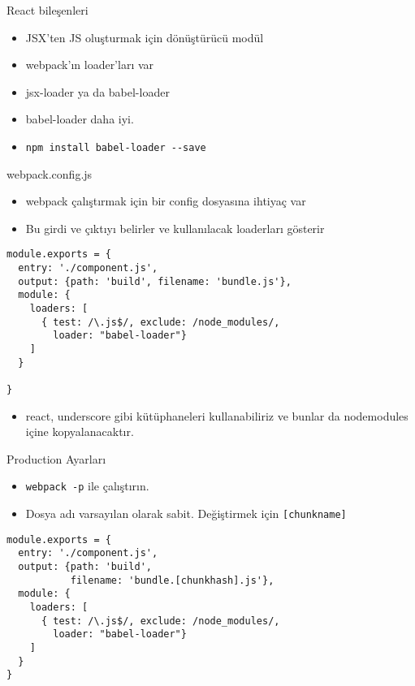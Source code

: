 \documentclass[presentation]{beamer}
\begin{document}
\begin{frame}[fragile,label=sec-6]{React bileşenleri}
 \begin{itemize}
\item JSX'ten JS oluşturmak için dönüştürücü modül
\item webpack'ın loader'ları var
\item jsx-loader ya da babel-loader
\item babel-loader daha iyi.
\item \texttt{npm install babel-loader -{}-save}
\end{itemize}
\end{frame}

\begin{frame}[fragile,label=sec-7]{webpack.config.js}
 \begin{itemize}
\item webpack çalıştırmak için bir config dosyasına ihtiyaç var
\item Bu girdi ve çıktıyı belirler ve kullanılacak loaderları gösterir
\end{itemize}

\begin{verbatim}
module.exports = {
  entry: './component.js',
  output: {path: 'build', filename: 'bundle.js'},
  module: {
    loaders: [
      { test: /\.js$/, exclude: /node_modules/,
        loader: "babel-loader"}
    ]
  }

}
\end{verbatim}

\begin{itemize}
\item react, underscore gibi kütüphaneleri kullanabiliriz ve bunlar da
nodemodules içine kopyalanacaktır.
\end{itemize}
\end{frame}

\begin{frame}[fragile,label=sec-8]{Production Ayarları}
 \begin{itemize}
\item \texttt{webpack -p} ile çalıştırın.
\item Dosya adı varsayılan olarak sabit. Değiştirmek için \texttt{[chunkname]}
\end{itemize}
\begin{verbatim}
module.exports = {
  entry: './component.js',
  output: {path: 'build',
           filename: 'bundle.[chunkhash].js'},
  module: {
    loaders: [
      { test: /\.js$/, exclude: /node_modules/,
        loader: "babel-loader"}
    ]
  }
}
\end{verbatim}
\end{frame}
\end{document}

